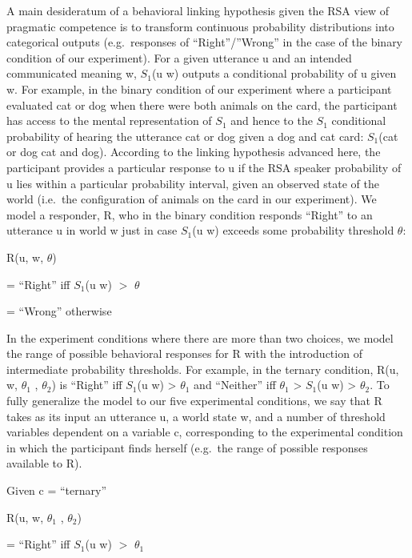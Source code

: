 \documentclass[floatsintext,man]{apa6}
\theoremstyle{definition}
\theoremstyle{definition}
\theoremstyle{definition}
\theoremstyle{remark}
\begin{document}
A main desideratum of a behavioral linking hypothesis given the RSA view
of pragmatic competence is to transform continuous probability
distributions into categorical outputs (e.g.~responses of
\enquote{Right}/''Wrong'' in the case of the binary condition of our
experiment). For a given utterance u and an intended communicated
meaning w, \(S_1\)(u \textbar{} w) outputs a conditional probability of
u given w. For example, in the binary condition of our experiment where
a participant evaluated cat or dog when there were both animals on the
card, the participant has access to the mental representation of \(S_1\)
and hence to the \(S_1\) conditional probability of hearing the
utterance cat or dog given a dog and cat card: \(S_1\)(cat or dog
\textbar{} cat and dog). According to the linking hypothesis advanced
here, the participant provides a particular response to u if the RSA
speaker probability of u lies within a particular probability interval,
given an observed state of the world (i.e.~the configuration of animals
on the card in our experiment). We model a responder, R, who in the
binary condition responds \enquote{Right} to an utterance u in world w
just in case \(S_1\)(u \textbar{} w) exceeds some probability threshold
\(\theta\):

R(u, w, \(\theta\))

= \enquote{Right} iff \(S_1\)(u \textbar{} w) \(>\) \(\theta\)

= \enquote{Wrong} otherwise

In the experiment conditions where there are more than two choices, we
model the range of possible behavioral responses for R with the
introduction of intermediate probability thresholds. For example, in the
ternary condition, R(u, w, \(\theta_1\) , \(\theta_2\)) is
\enquote{Right} iff \(S_1\)(u \textbar{} w) \textgreater{} \(\theta_1\)
and \enquote{Neither} iff \(\theta_1\) \textgreater{} \(S_1\)(u
\textbar{} w) \textgreater{} \(\theta_2\). To fully generalize the model
to our five experimental conditions, we say that R takes as its input an
utterance u, a world state w, and a number of threshold variables
dependent on a variable c, corresponding to the experimental condition
in which the participant finds herself (e.g.~the range of possible
responses available to R).

Given c = \enquote{ternary}

R(u, w, \(\theta_1\) , \(\theta_2\))

= \enquote{Right} iff \(S_1\)(u \textbar{} w) \(>\) \(\theta_1\)
\end{document}
